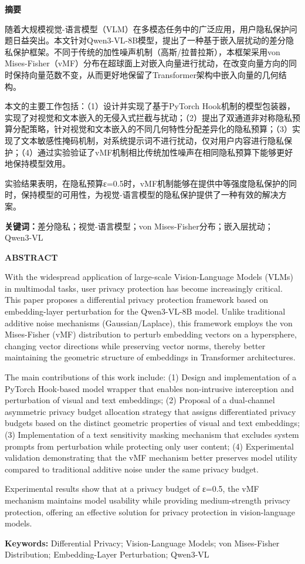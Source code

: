 \documentclass[a4paper,12pt]{article}
\newcommand{\xiaoerhao}{\fontsize{18pt}{\baselineskip}\selectfont}
\newcommand{\xiaosihao}{\fontsize{12pt}{\baselineskip}\selectfont}
\newenvironment{cnabstract}{
  \newpage
  \begin{center}
    \xiaoerhao\songti\bfseries 摘\quad 要
  \end{center}
  \vspace{1\baselineskip}
  \xiaosihao\songti
}{
  \vspace{1\baselineskip}
}
\newcommand{\cnkeywords}[1]{
  \noindent\textbf{关键词：}#1
}
\newenvironment{enabstract}{
  \newpage
  \begin{center}
    \xiaoerhao\bfseries ABSTRACT
  \end{center}
  \vspace{1\baselineskip}
  \xiaosihao
}{
  \vspace{1\baselineskip}
}
\newcommand{\enkeywords}[1]{
  \noindent\textbf{Keywords: }#1
}
\begin{document}

\begin{cnabstract}
随着大规模视觉-语言模型（VLM）在多模态任务中的广泛应用，用户隐私保护问题日益突出。本文针对Qwen3-VL-8B模型，提出了一种基于嵌入层扰动的差分隐私保护框架。不同于传统的加性噪声机制（高斯/拉普拉斯），本框架采用von Mises-Fisher（vMF）分布在超球面上对嵌入向量进行扰动，在改变向量方向的同时保持向量范数不变，从而更好地保留了Transformer架构中嵌入向量的几何结构。

本文的主要工作包括：（1）设计并实现了基于PyTorch Hook机制的模型包装器，实现了对视觉和文本嵌入的无侵入式拦截与扰动；（2）提出了双通道非对称隐私预算分配策略，针对视觉和文本嵌入的不同几何特性分配差异化的隐私预算；（3）实现了文本敏感性掩码机制，对系统提示词不进行扰动，仅对用户内容进行隐私保护；（4）通过实验验证了vMF机制相比传统加性噪声在相同隐私预算下能够更好地保持模型效用。

实验结果表明，在隐私预算ε=0.5时，vMF机制能够在提供中等强度隐私保护的同时，保持模型的可用性，为视觉-语言模型的隐私保护提供了一种有效的解决方案。

\cnkeywords{差分隐私；视觉-语言模型；von Mises-Fisher分布；嵌入层扰动；Qwen3-VL}
\end{cnabstract}

\begin{enabstract}
With the widespread application of large-scale Vision-Language Models (VLMs) in multimodal tasks, user privacy protection has become increasingly critical. This paper proposes a differential privacy protection framework based on embedding-layer perturbation for the Qwen3-VL-8B model. Unlike traditional additive noise mechanisms (Gaussian/Laplace), this framework employs the von Mises-Fisher (vMF) distribution to perturb embedding vectors on a hypersphere, changing vector directions while preserving vector norms, thereby better maintaining the geometric structure of embeddings in Transformer architectures.

The main contributions of this work include: (1) Design and implementation of a PyTorch Hook-based model wrapper that enables non-intrusive interception and perturbation of visual and text embeddings; (2) Proposal of a dual-channel asymmetric privacy budget allocation strategy that assigns differentiated privacy budgets based on the distinct geometric properties of visual and text embeddings; (3) Implementation of a text sensitivity masking mechanism that excludes system prompts from perturbation while protecting only user content; (4) Experimental validation demonstrating that the vMF mechanism better preserves model utility compared to traditional additive noise under the same privacy budget.

Experimental results show that at a privacy budget of ε=0.5, the vMF mechanism maintains model usability while providing medium-strength privacy protection, offering an effective solution for privacy protection in vision-language models.

\enkeywords{Differential Privacy; Vision-Language Models; von Mises-Fisher Distribution; Embedding-Layer Perturbation; Qwen3-VL}
\end{enabstract}
\end{document}
